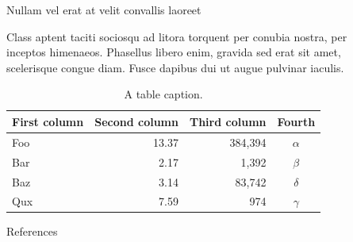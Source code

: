 \documentclass[final]{beamer}
\newlength{\sepwidth}
\newlength{\colwidth}
\newcommand{\separatorcolumn}{\begin{column}{\sepwidth}\end{column}}
\begin{document}
\begin{frame}[t]
\begin{columns}[t]
\begin{column}{\colwidth}
  \begin{block}{Nullam vel erat at velit convallis laoreet}

    Class aptent taciti sociosqu ad litora torquent per conubia nostra, per
    inceptos himenaeos. Phasellus libero enim, gravida sed erat sit amet,
    scelerisque congue diam. Fusce dapibus dui ut augue pulvinar iaculis.

    \begin{table}
      \centering
      \begin{tabular}{l r r c}
        \toprule
        \textbf{First column} & \textbf{Second column} & \textbf{Third column} & \textbf{Fourth} \\
        \midrule
        Foo & 13.37 & 384,394 & $\alpha$ \\
        Bar & 2.17 & 1,392 & $\beta$ \\
        Baz & 3.14 & 83,742 & $\delta$ \\
        Qux & 7.59 & 974 & $\gamma$ \\
        \bottomrule
      \end{tabular}
      \caption{A table caption.}
    \end{table}

  \end{block}

  \begin{block}{References}

    \nocite{*}
    \renewcommand{\bibfont}{\scriptsize} %
    \printbibliography

  \end{block}


\end{column}

\separatorcolumn
\end{columns}
\end{frame}
\end{document}
